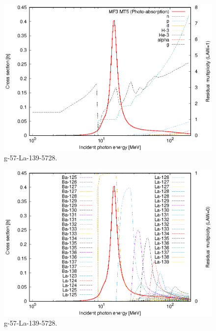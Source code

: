 \begin{figure}
 \includegraphics[width=\linewidth]{eps/g_57-La-139_5728.eps}
  \caption{g-57-La-139-5728.}
\end{figure}
\begin{figure}
 \includegraphics[width=\linewidth]{eps-law0/g_57-La-139_5728.eps}
 \caption{g-57-La-139-5728.}
\end{figure}
\newpage \clearpage

